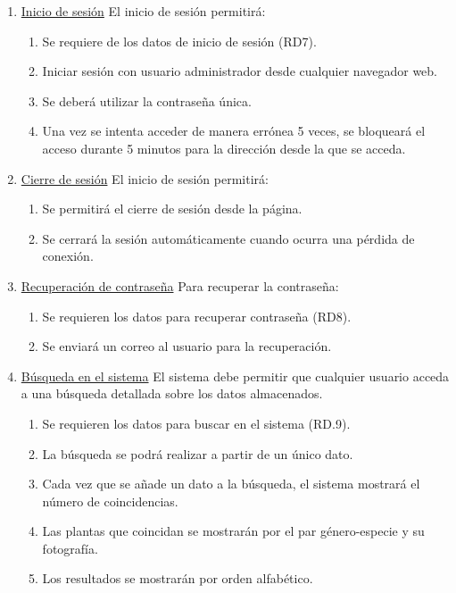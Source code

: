 \documentclass[10pt,a4paper]{article}
\begin{document}
\begin{enumerate}[label=RF\arabic*. ,leftmargin=2.8\parindent]
	\bigskip
	\item \underline{Inicio de sesión}
	\newline \newline
	El inicio de sesión permitirá:
	\begin{enumerate}[label=-]
	\item Se requiere de los datos de inicio de sesión (RD7).
		\item Iniciar sesión con usuario administrador desde cualquier navegador web.
		\item Se deberá utilizar la contraseña única.
		\item Una vez se intenta acceder de manera errónea 5 veces, se bloqueará el acceso durante 5 minutos para la dirección desde la que se acceda.
	\end{enumerate}


	\bigskip
	\item \underline{Cierre de sesión}
	\newline \newline
	El inicio de sesión permitirá:
	\begin{enumerate}[label=-]
		\item Se permitirá el cierre de sesión desde la página.
		\item Se cerrará la sesión automáticamente cuando ocurra una pérdida de conexión.
	\end{enumerate}

	\bigskip
	\item \underline{Recuperación de contraseña}
	\newline \newline
	Para recuperar la contraseña:
	\begin{enumerate}[label=-]
		\item Se requieren los datos para recuperar contraseña (RD8).
		\item Se enviará un correo al usuario para la recuperación.
	\end{enumerate}
	
	\bigskip
	\item \underline{Búsqueda en el sistema}
	\newline \newline
	El sistema debe permitir que cualquier usuario acceda a una búsqueda detallada sobre los datos almacenados.
	\begin{enumerate}[label=-]
		\item Se requieren los datos para buscar en el sistema (RD.9).
		\item La búsqueda se podrá realizar a partir de un único dato.
		\item Cada vez que se añade un dato a la búsqueda, el sistema mostrará el número de coincidencias.
		\item Las plantas que coincidan se mostrarán por el par género-especie y su fotografía.
		\item Los resultados se mostrarán por orden alfabético.
	\end{enumerate}
		

\end{enumerate}
\end{document}
